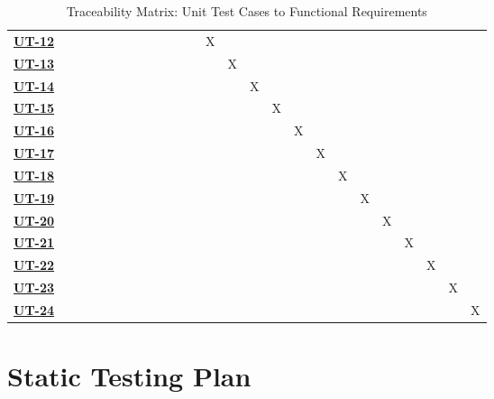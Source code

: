 \documentclass[12pt, titlepage]{article}
\begin{document}
\begin{enumerate}
\begin{landscape}
\begin{table}[H]
\begin{adjustbox}{width=1.4\textwidth}
\begin{tabular}{l|cccccccccccccccccccccccc}
        \hyperref[UT-12]{\textbf{UT-12}} &  &  &  &  &  &  &  &  &  &  &  & X &  &  &  &  &  &  &  &  &  &  &  &  \\
        \hyperref[UT-13]{\textbf{UT-13}} &  &  &  &  &  &  &  &  &  &  &  &  & X &  &  &  &  &  &  &  &  &  &  &  \\
        \hyperref[UT-14]{\textbf{UT-14}} &  &  &  &  &  &  &  &  &  &  &  &  &  & X &  &  &  &  &  &  &  &  &  &  \\
        \hyperref[UT-15]{\textbf{UT-15}} &  &  &  &  &  &  &  &  &  &  &  &  &  &  & X &  &  &  &  &  &  &  &  &  \\
        \hyperref[UT-16]{\textbf{UT-16}} &  &  &  &  &  &  &  &  &  &  &  &  &  &  &  & X &  &  &  &  &  &  &  &  \\
        \hyperref[UT-17]{\textbf{UT-17}} &  &  &  &  &  &  &  &  &  &  &  &  &  &  &  &  & X &  &  &  &  &  &  &  \\
        \hyperref[UT-17]{\textbf{UT-18}} &  &  &  &  &  &  &  &  &  &  &  &  &  &  &  &  & & X  &  &  &  &  &  &  \\
        \hyperref[UT-17]{\textbf{UT-19}} &  &  &  &  &  &  &  &  &  &  &  &  &  &  &  &  & & & X  &  &  &  &  &  \\
        \hyperref[UT-17]{\textbf{UT-20}} &  &  &  &  &  &  &  &  &  &  &  &  &  &  &  &  & & &  &  X  &  &  &  &  \\
        \hyperref[UT-17]{\textbf{UT-21}} &  &  &  &  &  &  &  &  &  &  &  &  &  &  &  &  & & &  &  &  X  &  &  &  \\
        \hyperref[UT-17]{\textbf{UT-22}} &  &  &  &  &  &  &  &  &  &  &  &  &  &  &  &  & & &  &  &  &  X  &  &  \\
        \hyperref[UT-17]{\textbf{UT-23}} &  &  &  &  &  &  &  &  &  &  &  &  &  &  &  &  & & &  &  &  &  &  X  &  \\
        \hyperref[UT-17]{\textbf{UT-24}} &  &  &  &  &  &  &  &  &  &  &  &  &  &  &  &  & & &  &  &  &  &  &  X  \\
        \hline
    \end{tabular}
    \end{adjustbox}
    \caption{Traceability Matrix: Unit Test Cases to Functional Requirements}
\end{table}
\end{landscape}


\newpage
\section{Static Testing Plan}


\end{enumerate}
\end{document}
